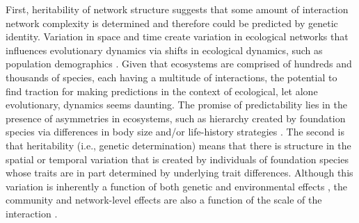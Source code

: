 \documentclass[fleqn,12pt]{olplainarticle}
\begin{document}
First, heritability of network structure suggests that some amount of
interaction network complexity is determined and therefore could be
predicted by genetic identity. Variation in space and time create
variation in ecological networks that influences evolutionary dynamics
via shifts in ecological dynamics, such as population demographics
\citep{Guimaraes2020TheOrganization}. Given that ecosystems are
comprised of hundreds and thousands of species, each having a
multitude of interactions, the potential to find traction for making
predictions in the context of ecological, let alone evolutionary,
dynamics seems daunting. The promise of predictability lies in the
presence of asymmetries in ecosystems, such as hierarchy created by
foundation species via differences in body size and/or life-history
strategies \citep{Ellison2005}. The second is that heritability (i.e.,
genetic determination) means that there is structure in the spatial or
temporal variation that is created by individuals of foundation
species whose traits are in part determined by underlying trait
differences. Although this variation is inherently a function of both
genetic and environmental effects \citep{Conner2004ATextbook}, the
community and network-level effects are also a function of the scale
of the interaction \citep{Shuster2006COMMUNITYSTRUCTURE}.
\end{document}
